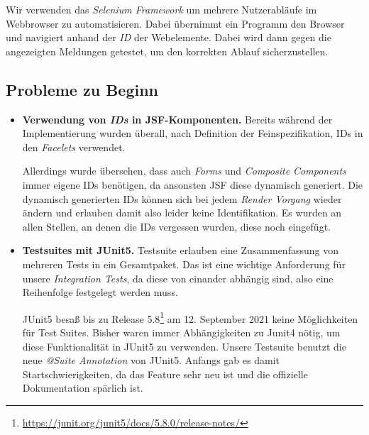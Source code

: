 
Wir verwenden das \emph{Selenium Framework} um mehrere Nutzerabläufe im Webbrowser zu automatisieren.
Dabei übernimmt ein Programm den Browser und navigiert anhand der \emph{ID}
der Webelemente. Dabei wird dann gegen die angezeigten Meldungen getestet, um
den korrekten Ablauf sicherzustellen.

\subsection{Probleme zu Beginn}

\begin{itemize}
	\item \textbf{Verwendung von \emph{IDs} in JSF-Komponenten.} Bereits während der
	Implementierung wurden überall, nach Definition der Feinspezifikation, IDs in den \emph{Facelets} verwendet.

	Allerdings wurde übersehen, dass auch \emph{Forms} und \emph{Composite Components} immer eigene IDs benötigen, da ansonsten JSF diese dynamisch
	generiert. Die dynamisch generierten IDs können sich bei jedem \emph{Render Vorgang} wieder ändern und erlauben damit also leider keine Identifikation.\newline
	Es wurden an allen Stellen, an denen die IDs vergessen wurden, diese noch eingefügt.

	\item \textbf{Testsuites mit JUnit5.} Testsuite erlauben eine Zusammenfassung von mehreren Tests in ein Gesamtpaket. Das ist eine wichtige
	Anforderung für unsere \emph{Integration Tests}, da diese von einander abhängig sind, also eine Reihenfolge festgelegt werden muss.

	JUnit5 besaß bis zu Release 5.8\footnote{\url{https://junit.org/junit5/docs/5.8.0/release-notes/}}
	am 12. September 2021 keine Möglichkeiten für Test Suites. Bisher waren immer Abhängigkeiten zu Junit4 nötig, um diese
	Funktionalität in JUnit5 zu verwenden. Unsere Testsuite benutzt die neue
	\emph{@Suite Annotation} von JUnit5. Anfangs gab es damit Startschwierigkeiten, da das Feature sehr neu ist und die offizielle
	Dokumentation spärlich ist.
\end{itemize}



